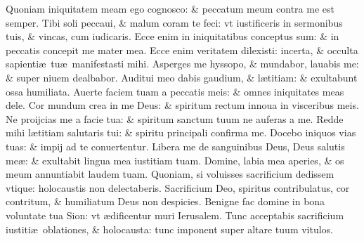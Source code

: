 \documentclass[a5paper,10pt]{book}
\def\ae{æ}
\begin{document}
\begin{multicols*}{2}
\newline \color{red} Q\color{black}uoniam iniquitatem meam ego cognosco: \& peccatum meum contra me est semper.
\newline \color{red} T\color{black}ibi soli peccaui, \& malum coram te feci: vt iustificeris in sermonibus tuis, \& vincas, cum iudicaris.
\newline \color{red} E\color{black}cce enim in iniquitatibus conceptus sum: \& in peccatis concepit me mater mea.
\newline \color{red} E\color{black}cce enim veritatem dilexisti: incerta, \& occulta sapienti\ae \ tu\ae \ manifestasti mihi.
\newline \color{red} A\color{black}sperges me hyssopo, \& mundabor, lauabis me: \& super niuem dealbabor.
\newline \color{red} A\color{black}uditui meo dabis gaudium, \& l\ae titiam: \& exultabunt ossa humiliata.
\newline \color{red} A\color{black}uerte faciem tuam a peccatis meis: \& omnes iniquitates meas dele.
\newline \color{red} C\color{black}or mundum crea in me Deus: \& spiritum rectum innoua in visceribus meis.
\newline \color{red} N\color{black}e proijcias me a facie tua: \& spiritum sanctum tuum ne auferas a me.
\newline \color{red} R\color{black}edde mihi l\ae titiam salutaris tui: \& spiritu principali confirma me.
\newline \color{red} D\color{black}ocebo iniquos vias tuas: \& impij ad te conuertentur.
\newline \color{red} L\color{black}ibera me de sanguinibus Deus, Deus salutis me\ae : \& exultabit lingua mea iustitiam tuam.
\newline \color{red} D\color{black}omine, labia mea aperies, \& os meum annuntiabit laudem tuam.
\newline \color{red} Q\color{black}uoniam, si voluisses sacrificium dedissem vtique: holocaustis non delectaberis.
\newline \color{red} S\color{black}acrificium Deo, spiritus contribulatus, cor contritum, \& humiliatum Deus non despicies.
\newline \color{red} B\color{black}enigne fac domine in bona voluntate tua Sion: vt \ae dificentur muri Ierusalem.
\newline \color{red} T\color{black}unc acceptabis sacrificium iustiti\ae \ oblationes, \& holocausta: tunc imponent super altare tuum vitulos.

\end{multicols*}
\end{document}
